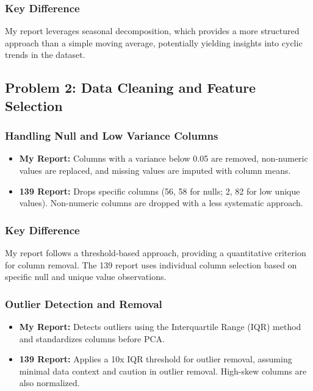 \subsubsection*{Key Difference}
My report leverages seasonal decomposition, which provides a more structured approach than a simple moving average, potentially yielding insights into cyclic trends in the dataset.

\subsection*{Problem 2: Data Cleaning and Feature Selection}

\subsubsection*{Handling Null and Low Variance Columns}
\begin{itemize}
    \item \textbf{My Report:} Columns with a variance below 0.05 are removed, non-numeric values are replaced, and missing values are imputed with column means.
    \item \textbf{139 Report:} Drops specific columns (56, 58 for nulls; 2, 82 for low unique values). Non-numeric columns are dropped with a less systematic approach.
\end{itemize}

\subsubsection*{Key Difference}
My report follows a threshold-based approach, providing a quantitative criterion for column removal. The 139 report uses individual column selection based on specific null and unique value observations.

\subsubsection*{Outlier Detection and Removal}
\begin{itemize}
    \item \textbf{My Report:} Detects outliers using the Interquartile Range (IQR) method and standardizes columns before PCA.
    \item \textbf{139 Report:} Applies a 10x IQR threshold for outlier removal, assuming minimal data context and caution in outlier removal. High-skew columns are also normalized.
\end{itemize}


